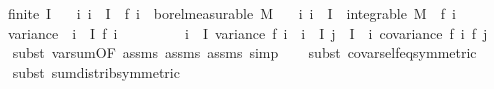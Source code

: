 \begin{isabellebody}
\ \ \ {\isachardoublequoteopen}finite\ I{\isachardoublequoteclose}\isanewline
\ \ \ {\isachardoublequoteopen}{\isasymAnd}i{\isachardot}{\kern0pt}\ i\ {\isasymin}\ I\ {\isasymLongrightarrow}\ f\ i\ {\isasymin}\ borel{\isacharunderscore}{\kern0pt}measurable\ M{\isachardoublequoteclose}\isanewline
\ \ \ {\isachardoublequoteopen}{\isasymAnd}i{\isachardot}{\kern0pt}\ i\ {\isasymin}\ I\ {\isasymLongrightarrow}\ integrable\ M\ {\isacharparenleft}{\kern0pt}{\isasymlambda}{\isasymomega}{\isachardot}{\kern0pt}\ f\ i\ {\isasymomega}{\isacharcircum}{\kern0pt}{}{\isacharparenright}{\kern0pt}{\isachardoublequoteclose}\isanewline
\ \ \ {\isachardoublequoteopen}variance\ {\isacharparenleft}{\kern0pt}{\isasymlambda}{\isasymomega}{\isachardot}{\kern0pt}\ {\isacharparenleft}{\kern0pt}{\isasymSum}i\ {\isasymin}\ I{\isachardot}{\kern0pt}\ f\ i\ {\isasymomega}{\isacharparenright}{\kern0pt}{\isacharparenright}{\kern0pt}\ {\isacharequal}{\kern0pt}\ \isanewline
\ \ \ \ \ \ {\isacharparenleft}{\kern0pt}{\isasymSum}i\ {\isasymin}\ I{\isachardot}{\kern0pt}\ variance\ {\isacharparenleft}{\kern0pt}f\ i{\isacharparenright}{\kern0pt}{\isacharparenright}{\kern0pt}\ {\isacharplus}{\kern0pt}\ {\isacharparenleft}{\kern0pt}{\isasymSum}i\ {\isasymin}\ I{\isachardot}{\kern0pt}\ {\isasymSum}j\ {\isasymin}\ I\ {\isacharminus}{\kern0pt}\ {\isacharbraceleft}{\kern0pt}i{\isacharbraceright}{\kern0pt}{\isachardot}{\kern0pt}\ covariance\ {\isacharparenleft}{\kern0pt}f\ i{\isacharparenright}{\kern0pt}\ {\isacharparenleft}{\kern0pt}f\ j{\isacharparenright}{\kern0pt}{\isacharparenright}{\kern0pt}{\isachardoublequoteclose}\isanewline
%
\isadelimproof
\ \ %
\endisadelimproof
%
\isatagproof
{}\isamarkupfalse%
\ {\isacharparenleft}{\kern0pt}subst\ var{\isacharunderscore}{\kern0pt}sum{\isacharunderscore}{\kern0pt}{}{\isacharbrackleft}{\kern0pt}OF\ assms{\isacharparenleft}{\kern0pt}{}{\isacharparenright}{\kern0pt}\ assms{\isacharparenleft}{\kern0pt}{}{\isacharparenright}{\kern0pt}\ assms{\isacharparenleft}{\kern0pt}{}{\isacharparenright}{\kern0pt}{\isacharbrackright}{\kern0pt}{\isacharcomma}{\kern0pt}\ simp{\isacharparenright}{\kern0pt}\isanewline
\ \ \isamarkupfalse%
\ {\isacharparenleft}{\kern0pt}subst\ covar{\isacharunderscore}{\kern0pt}self{\isacharunderscore}{\kern0pt}eq{\isacharbrackleft}{\kern0pt}symmetric{\isacharbrackright}{\kern0pt}{\isacharparenright}{\kern0pt}\isanewline
\ \ \isamarkupfalse%
\ {\isacharparenleft}{\kern0pt}subst\ sum{\isachardot}{\kern0pt}distrib{\isacharbrackleft}{\kern0pt}symmetric{\isacharbrackright}{\kern0pt}{\isacharparenright}{\kern0pt}\isanewline

\end{isabellebody}
